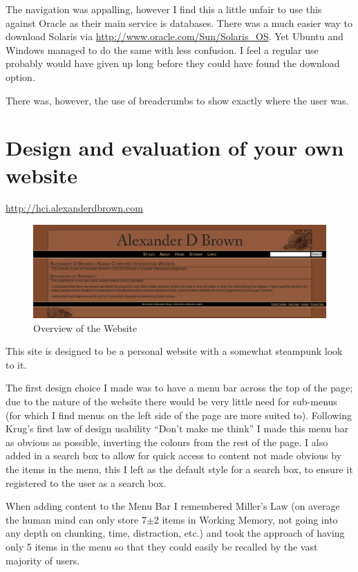 \documentclass[10pt,letterpaper]{article}
\begin{document}
	The navigation was appalling, however I find this a little unfair to use this against Oracle as their main service is databases. There was a much easier way to download Solaris via \url{http://www.oracle.com/Sun/Solaris_OS}.
	Yet Ubuntu and Windows managed to do the same with less confusion. I feel a regular use probably would have given up long before they could have found the download option.
	
	There was, however, the use of breadcrumbs to show exactly where the user was.

\newpage
 
  \section{Design and evaluation of your own website}
	\url{http://hci.alexanderdbrown.com}
	
	\begin{figure}[htb]
		\begin{center}
		\includegraphics[scale=0.3]{overview.png}
		\caption{Overview of the Website}
		\end{center}
	\end{figure}

	This site is designed to be a personal website with a somewhat steampunk look to it.

	The first design choice I made was to have a menu bar across the top of the page; due to the nature of the website there would be very little need for sub-menus (for which I find menus on the left side of the page are more suited to). Following Krug's first law of design usability ``Don't make me think''\cite{krug06} I made this menu bar as obvious as possible, inverting the colours from the rest of the page. I also added in a search box to allow for quick access to content not made obvious by the items in the menu, this I left as the default style for a search box, to ensure it registered to the user as a search box.

	When adding content to the Menu Bar I remembered Miller's Law\cite{miller56} (on average the human mind can only store 7$\pm$2 items in Working Memory, not going into any depth on chunking, time, distraction, etc.) and took the approach of having only 5 items in the menu so that they could easily be recalled by the vast majority of users. 
\end{document}
